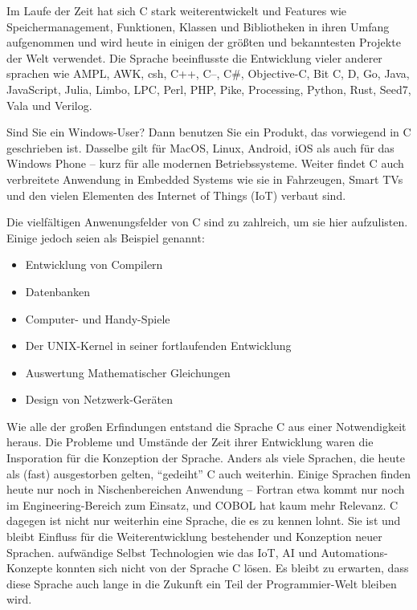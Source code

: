 \begin{appendices}
Im Laufe der Zeit hat sich C stark weiterentwickelt und Features wie Speichermanagement, Funktionen, Klassen und Bibliotheken in ihren Umfang aufgenommen und wird heute in einigen der größten und bekanntesten Projekte der Welt verwendet. Die Sprache beeinflusste die Entwicklung vieler anderer sprachen wie AMPL, AWK, csh, C++, C--, C\#, Objective-C, Bit C, D, Go, Java, JavaScript, Julia, Limbo, LPC, Perl, PHP, Pike, Processing, Python, Rust, Seed7, Vala und Verilog. 

Sind Sie ein Windows-User? Dann benutzen Sie ein Produkt, das vorwiegend in C geschrieben ist. Dasselbe gilt für MacOS, Linux, Android, iOS als auch für das Windows Phone -- kurz für alle modernen Betriebssysteme. Weiter findet C auch verbreitete Anwendung in Embedded Systems wie sie in Fahrzeugen, Smart TVs und den vielen Elementen des Internet of Things (IoT) verbaut sind.

Die vielfältigen Anwenungsfelder von C sind zu zahlreich, um sie hier aufzulisten. Einige jedoch seien als Beispiel genannt:
\begin{itemize}
\item Entwicklung von Compilern
\item Datenbanken 
\item Computer- und Handy-Spiele
\item Der UNIX-Kernel in seiner fortlaufenden Entwicklung
\item Auswertung Mathematischer Gleichungen
\item Design von Netzwerk-Geräten
\end{itemize}

Wie alle der großen Erfindungen entstand die Sprache C aus einer Notwendigkeit heraus. Die Probleme und Umstände der Zeit ihrer Entwicklung waren die Insporation für die Konzeption der Sprache. Anders als viele Sprachen, die heute als (fast) ausgestorben gelten, \enquote{gedeiht} C auch weiterhin. Einige Sprachen finden heute nur noch in Nischenbereichen Anwendung -- Fortran etwa kommt nur noch im Engineering-Bereich zum Einsatz, und COBOL hat kaum mehr Relevanz. C dagegen ist nicht nur weiterhin eine Sprache, die es zu kennen lohnt. Sie ist und bleibt Einfluss für die Weiterentwicklung bestehender und Konzeption neuer Sprachen. aufwändige Selbst Technologien wie das IoT, AI und Automations-Konzepte konnten sich nicht von der Sprache C lösen. Es bleibt zu erwarten, dass diese Sprache auch lange in die Zukunft ein Teil der Programmier-Welt bleiben wird.
\end{appendices}
